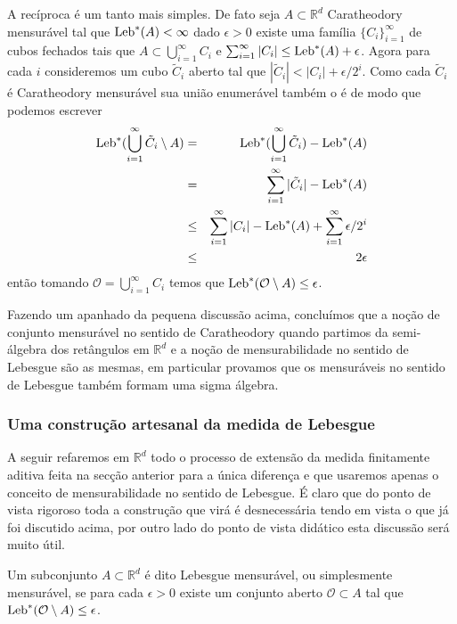 A recíproca é um tanto mais simples. De fato seja $A\subset \mathbb{R}^d$ Caratheodory mensurável tal que $\textnormal{Leb}^{*}(A)<\infty$ dado $\epsilon>0$  existe uma família $\{C_i\}_{i=1}^{\infty}$ de cubos fechados tais que 
$A\subset \bigcup_{i=1}^{\infty}C_i$ e $\sum_{i=1}^{\infty}|C_i|\leq \textnormal{Leb}^{*}(A)+\epsilon$. Agora para cada $i$ consideremos um cubo $\tilde{C}_i$ aberto tal que $|\tilde{C}_i|<|C_i|+\epsilon/2^{i}.$
Como cada $\tilde{C}_i$ é Caratheodory mensurável sua união enumerável também o é de modo que podemos escrever 
\begin{eqnarray*}
\textnormal{Leb}^{*}(\bigcup_{i=1}^{\infty} \tilde{C}_i\setminus A)&=&\textnormal{Leb}^{*}(\bigcup_{i=1}^{\infty} \tilde{C}_i)-\textnormal{Leb}^{*}(A)
\\
&
=
&
\sum_{i=1}^{\infty}|\tilde{C}_i|-\textnormal{Leb}^{*}(A)
\\
&
\leq 
&
\sum_{i=1}^{\infty}|C_i|-\textnormal{Leb}^{*}(A)+\sum_{i=1}^{\infty}\epsilon/2^i
\\
&
\leq 
&
2\epsilon
\end{eqnarray*}
 então tomando  $\mathcal{O}=\bigcup_{i=1}^{\infty}C_i$ temos que $\textnormal{Leb}^{*}(\mathcal{O}\setminus A)\leq \epsilon$.
 
Fazendo um apanhado da pequena discussão acima, concluímos que a noção de conjunto mensurável no sentido de Caratheodory quando partimos da semi-álgebra dos retângulos em $\mathbb{R}^d$ e a noção de mensurabilidade no sentido de Lebesgue são as mesmas, em particular provamos que os mensuráveis no sentido de Lebesgue também formam uma sigma álgebra.




\subsubsection{Uma construção artesanal da medida de Lebesgue}

A seguir refaremos em $\mathbb{R}^d$ todo o processo de extensão da medida finitamente aditiva feita na secção anterior para a única diferença e que usaremos apenas o conceito de mensurabilidade no sentido de Lebesgue.
É claro que do ponto de vista rigoroso toda a construção que virá é desnecessária tendo em vista o que já foi discutido acima, por outro lado do ponto de vista didático esta discussão será  muito útil.









\begin{definicao}
Um subconjunto $A\subset \mathbb{R}^d$ é dito Lebesgue mensurável, ou simplesmente mensurável,  se para cada $\epsilon>0$ existe um conjunto aberto $\mathcal{O}\subset A$ tal que $\textnormal{Leb}^{*}(\mathcal{O}\setminus A)\leq \epsilon$.
\end{definicao}


